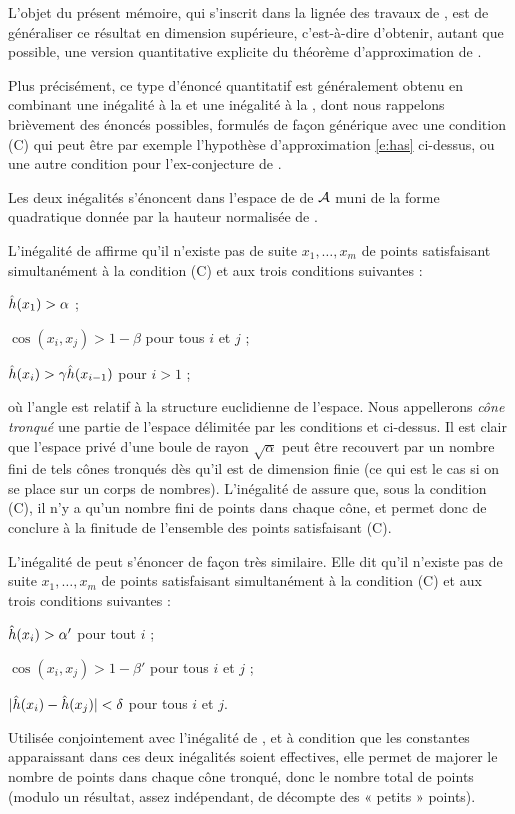 L'objet du présent mémoire, qui s'inscrit dans la lignée des travaux de
, est de généraliser ce résultat en dimension supérieure,
c'est-à-dire d'obtenir, autant que possible, une version quantitative
explicite du théorème d'approximation de .

\medskip

Plus précisément, ce type d'énoncé quantitatif est généralement obtenu en
combinant une inégalité à la  et une inégalité à la ,
dont nous rappelons brièvement des énoncés possibles, formulés de façon
générique avec une condition (C) qui peut être par exemple l'hypothèse
d'approximation \eqref{e:has} ci-dessus, ou une autre condition pour
l'ex-conjecture de .

Les deux inégalités s'énoncent dans l'espace de  de \( \mathcal A \)
muni de la forme quadratique donnée par la hauteur normalisée de
.

L'inégalité de  affirme qu'il n'existe pas de suite \( x_1, \dots,
  x_m \) de points satisfaisant simultanément à la condition (C) et aux trois
conditions suivantes :
\begin{enumthm}
  \item \( \hat h (x_1) > \alpha \) ; \label{i:grand}
  \item \( \cos(x_i, x_j) > 1 - \beta \) pour tous \( i \) et \( j \) ;
    \label{i:proche}
  \item \( \hat h (x_i) > \gamma \hat h (x_{i-1}) \) pour \( i > 1 \) ;
\end{enumthm}
où l'angle est relatif à la structure euclidienne de l'espace. Nous
appellerons \emph{cône tronqué} une partie de l'espace délimitée par les
conditions  et  ci-dessus. Il est clair que
l'espace privé d'une boule de rayon \( \sqrt{\alpha} \) peut être recouvert
par un nombre fini de tels cônes tronqués dès qu'il est de dimension finie (ce
qui est le cas si on se place sur un corps de nombres). L'inégalité de
 assure que, sous la condition (C), il n'y a qu'un nombre fini de
points dans chaque cône, et permet donc de conclure à la finitude de
l'ensemble des points satisfaisant (C).

L'inégalité de  peut s'énoncer de façon très similaire. Elle dit
qu'il n'existe pas de suite \( x_1, \dots, x_m \) de points satisfaisant
simultanément à la condition (C) et aux trois conditions suivantes :
\begin{enumthm}
  \item \( \hat h (x_i) > \alpha' \) pour tout \( i \) ;
  \item \( \cos(x_i, x_j) > 1 - \beta' \) pour tous \( i \) et \( j \) ;
  \item \( \lvert \hat h (x_i) - \hat h (x_j) \rvert < \delta \) pour tous \( i \) et
    \( j \).
\end{enumthm}
Utilisée conjointement avec l'inégalité de , et à condition que les
constantes apparaissant dans ces deux inégalités soient effectives, elle
permet de majorer le nombre de points dans chaque cône tronqué, donc le nombre
total de points (modulo un résultat, assez indépendant, de décompte des «
petits » points).

